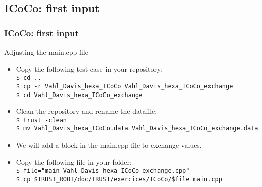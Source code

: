 \documentclass[10pt, hyperref={unicode=true,pdfusetitle, bookmarks=true,bookmarksnumbered=false,bookmarksopen=false, breaklinks=false,pdfborder={0 0 1},backref=true,colorlinks=true,linkcolor=darkblue,pageanchor, urlcolor=darkblue}]{beamer}
\begin{document}
\subsection{{\bf{ICoCo: first input}}}
\begin{frame}
\end{frame}
\begin{frame}
\frametitle{ICoCo: first input}
\begin{block}{Adjusting the main.cpp file}

\begin{itemize}
\item Copy the following test case in your repository:\\
\texttt{\$ cd ..}\\
\texttt{\$ cp -r Vahl\_Davis\_hexa\_ICoCo Vahl\_Davis\_hexa\_ICoCo\_exchange}\\
\texttt{\$ cd Vahl\_Davis\_hexa\_ICoCo\_exchange}\\
\item Clean the repository and rename the datafile:\\
\texttt{\$ trust -clean}\\
\texttt{\$ mv Vahl\_Davis\_hexa\_ICoCo.data Vahl\_Davis\_hexa\_ICoCo\_exchange.data }\\
\item We will add a block in the main.cpp file to exchange values.
\item Copy the following file in your folder:\\
\texttt{\$ file="main\_Vahl\_Davis\_hexa\_ICoCo\_exchange.cpp"}\\ 
\texttt{\$ cp \$TRUST\_ROOT/doc/TRUST/exercices/ICoCo/\$file main.cpp}
\end{itemize}

\end{block}
\end{frame}
\end{document}
